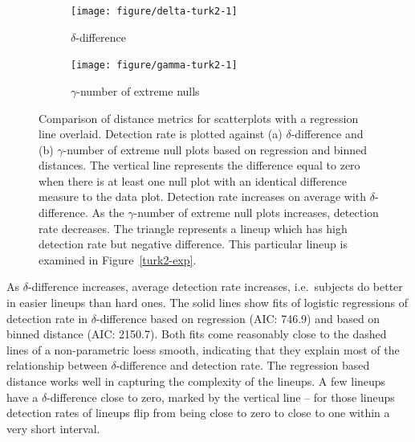\documentclass[12pt]{article}\usepackage[]{graphicx}\usepackage[]{color}
\newenvironment{knitrout}{}{} %
\begin{document}
\begin{figure}[!t]
\begin{subfigure}[t]{\textwidth}
\centering
\caption{\label{turk2comp-1}$\delta$-difference }
\begin{knitrout}
\color{fgcolor}
\texttt{[image: figure/delta-turk2-1]} 

\end{knitrout}
\end{subfigure}
\begin{subfigure}[t]{\textwidth}
\centering
\caption{\label{turk2comp-2}$\gamma$-number of extreme nulls }
\begin{knitrout}
\color{fgcolor}
\texttt{[image: figure/gamma-turk2-1]} 

\end{knitrout}
\end{subfigure}
	\vspace{-.1in}
\caption{Comparison of distance metrics for scatterplots with a regression line overlaid.  Detection rate is plotted against (a) $\delta$-difference  and (b) $\gamma$-number of extreme null plots  based on  regression and binned distances. The vertical line represents the difference equal to zero when there is at least one null plot with an identical difference measure to the data plot. 
Detection rate increases  on average with $\delta$-difference. As the $\gamma$-number of extreme null plots increases,  detection rate decreases.  The triangle represents a lineup which has high detection rate but negative difference. This particular lineup is examined in Figure~\ref{turk2-exp}.}
\label{turk2comp}
\end{figure}

 As $\delta$-difference increases,  average detection rate increases, i.e.\ subjects do better in  easier lineups than hard ones. The solid lines show fits of logistic regressions of detection rate in $\delta$-difference based on regression (AIC: 746.9) and based on binned distance (AIC: 2150.7). Both fits come reasonably close to the dashed lines of a non-parametric loess smooth, indicating that they explain most of the relationship between $\delta$-difference and detection rate.
The regression based distance works well in capturing the complexity of the lineups. %
A few lineups have a $\delta$-difference close to zero, marked by the vertical line -- for those lineups detection rates of lineups flip from being close to zero to close to one within a very short interval. 
\end{document}
